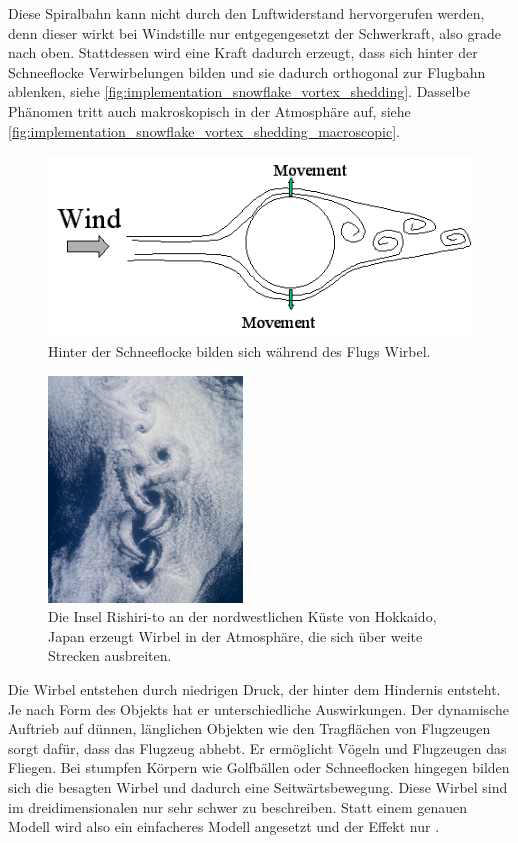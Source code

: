 Diese Spiralbahn kann nicht durch den Luftwiderstand hervorgerufen
werden, denn dieser wirkt bei Windstille nur entgegengesetzt der
Schwerkraft, also grade nach oben. Stattdessen wird eine Kraft dadurch
erzeugt, dass sich hinter der Schneeflocke Verwirbelungen bilden und
sie dadurch orthogonal zur Flugbahn ablenken, siehe
\autoref{fig:implementation_snowflake_vortex_shedding}. Dasselbe
Phänomen tritt auch makroskopisch in der Atmosphäre auf, siehe
\autoref{fig:implementation_snowflake_vortex_shedding_macroscopic}.

\begin{figure}[ht]
    \centering
    \includegraphics{images/vortex_shedding}
    \caption{Hinter der Schneeflocke bilden sich während des Flugs Wirbel.}
    \label{fig:implementation_snowflake_vortex_shedding}
\end{figure}

\begin{figure}[ht]
    \centering
    \includegraphics{images/vortex_shedding_macroscopic}
    \caption{Die Insel Rishiri-to an der nordwestlichen Küste von Hokkaido, Japan erzeugt Wirbel in der Atmosphäre, die sich über weite Strecken ausbreiten.}
    \label{fig:implementation_snowflake_vortex_shedding_macroscopic}
\end{figure}

Die Wirbel entstehen durch niedrigen Druck, der hinter dem Hindernis
entsteht. Je nach Form des Objekts hat er unterschiedliche
Auswirkungen. Der dynamische Auftrieb auf dünnen, länglichen Objekten
wie den Tragflächen von Flugzeugen sorgt dafür, dass das Flugzeug
abhebt. Er ermöglicht Vögeln und Flugzeugen das Fliegen. Bei stumpfen
Körpern wie Golfbällen oder Schneeflocken hingegen bilden sich die
besagten Wirbel und dadurch eine Seitwärtsbewegung. Diese Wirbel sind
im dreidimensionalen nur sehr schwer zu beschreiben. Statt einem
genauen Modell wird also ein einfacheres Modell angesetzt und der
Effekt nur .


